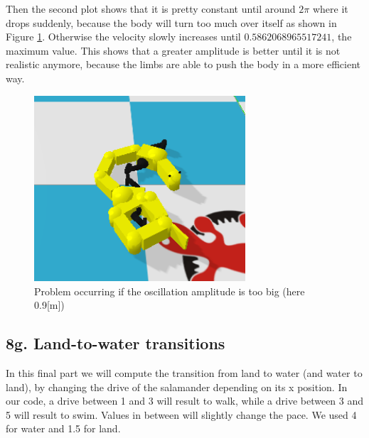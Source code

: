 \documentclass{cmc}
\begin{document}
Then the second plot shows that it is pretty constant until around $2\pi$ where it drops suddenly, because the body will turn too much over itself as shown in Figure \ref{fig:8f_oscillation}. Otherwise the velocity slowly increases until $0.5862068965517241$, the maximum value. This shows that a greater amplitude is better until it is not realistic anymore, because the limbs are able to push the body in a more efficient way.

\begin{figure}[H]
  \centering
  \includegraphics[width=0.7\textwidth]{figures/8f_oscillation_0_9.png}
  \caption{Problem occurring if the oscillation amplitude is too big (here 0.9[m])}
  \label{fig:8f_oscillation}
\end{figure}

\subsection*{8g. Land-to-water transitions}

In this final part we will compute the transition from land to water (and water to land), by changing the drive of the salamander depending on its x position. In our code, a drive between 1 and 3 will result to walk, while a drive between 3 and 5 will result to swim. Values in between will slightly change the pace. We used 4 for water and 1.5 for land. 
\end{document}
